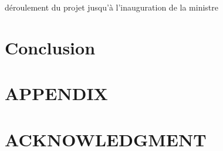 \documentclass[letterpaper, 10 pt, conference]{IEEEtran}
\begin{document}
        déroulement du projet
        jusqu’à l’inauguration de la ministre

        \section{Conclusion}


        \section*{APPENDIX}
        \section*{ACKNOWLEDGMENT}
        \addtolength{\textheight}{-12cm}  %
        
\end{document}
